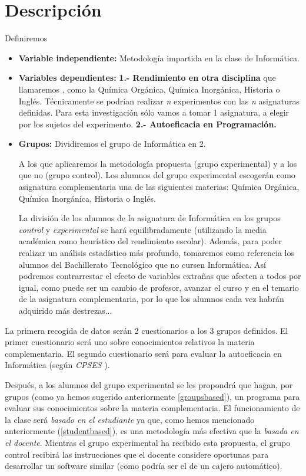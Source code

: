 \documentclass[palatino,miniheader]{apuntesURJC}
\newcommand{\CPSES}{\textit{\gls{CPSES}} \cite{CPSES}}
\begin{document}
\section{Descripción}
Definiremos 
\begin{itemize}
	\item \textbf{Variable independiente:} Metodología impartida en la clase de Informática.
	\item \textbf{Variables dependientes:} 
	\subitem \textbf{1.- Rendimiento en otra disciplina} que llamaremos , como la Química Orgánica, Química Inorgánica, Historia o Inglés.
	\subitem Técnicamente se podrían realizar \textit{n} experimentos con las \textit{n} asignaturas definidas. 
	Para esta investigación sólo vamos a tomar 1 asignatura, a elegir por los sujetos del experimento.
	\subitem \textbf{2.- Autoeficacia en Programación.}
	\item \textbf{Grupos:}
	\subitem Dividiremos el grupo de Informática en 2.

	A los que aplicaremos la  metodología propuesta (grupo experimental) y a los que no (grupo control).
	Los alumnos del grupo experimental escogerán como asignatura complementaria una de las siguientes materias: Química Orgánica, Química Inorgánica, Historia o Inglés. 
	


	\subitem La división de los alumnos de la asignatura de Informática en los grupos \textit{control} y \textit{experimental} se hará equilibradamente (utilizando la media académica como heurístico del rendimiento escolar).
	\subitem Además, para poder realizar un análisis estadístico más profundo, tomaremos como referencia los alumnos del Bachillerato Tecnológico que no cursen Informática.
	Así podremos contrarrestar el efecto de variables extrañas que afecten a todos por igual, como puede ser un cambio de profesor, avanzar el curso y en el temario de la asignatura complementaria, por lo que los alumnos cada vez habrán adquirido más destrezas...
\end{itemize}


La primera recogida de datos serán 2 cuestionarios a los 3 grupos definidos.
%
\label{descDatos}
%
El primer cuestionario será uno sobre conocimientos relativos la materia complementaria.
%
El segundo cuestionario será para evaluar la autoeficacia en Informática (según \CPSES).

Después, a los alumnos del grupo experimental se les propondrá que hagan, por grupos (como ya hemos sugerido anteriormente \ref{groupsbased}), un programa para evaluar sus conocimientos sobre la materia complementaria.
%
El funcionamiento de la clase será \textit{basado en el estudiante} ya que, como hemos mencionado anteriormente (\ref{studentbased}), es una metodología más efectiva que la \textit{basada en el docente}.
%
Mientras el grupo experimental ha recibido esta propuesta, el grupo control recibirá las instrucciones que el docente considere oportunas para desarrollar un software similar (como podría ser el de un cajero automático).
\end{document}
